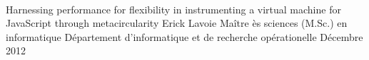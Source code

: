 \documentclass[letterpaper,9pt]{report}
\begin{document}


% 


\newpage
\addtocounter{page}{-1}
\thispagestyle{empty}
\vspace{1cm}
\ \\
\newpage
\titrememoire
    {Harnessing performance for flexibility in instrumenting a virtual machine
    for JavaScript through metacircularity}
	{Erick Lavoie}
	{Ma\^itre \`es sciences (M.Sc.) en informatique}
	{D\'epartement d'informatique et de recherche op\'erationelle}
	{D\'ecembre 2012}



%

%











%





% 
\newpage
\addtocounter{page}{-1}
\thispagestyle{empty}
\vspace{1cm}
\ \\
\end{document}
